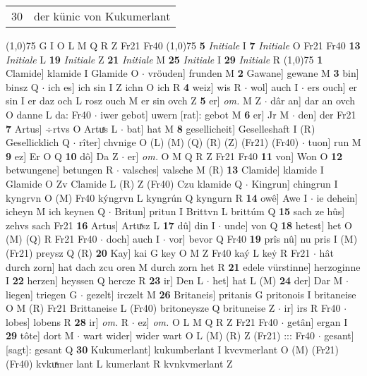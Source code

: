 \documentclass[8pt,a4paper,notitlepage]{article}
\begin{document}
\begin{table}[ht]
\begin{minipage}[t]{0.5\linewidth}
\begin{tabular}{rl}
30 & der künic von Kukumerlant\\ 
\end{tabular}
\scriptsize
\line(1,0){75} \newline
G I O L M Q R Z Fr21 Fr40 \newline
\line(1,0){75} \newline
\textbf{5} \textit{Initiale} I  \textbf{7} \textit{Initiale} O Fr21 Fr40  \textbf{13} \textit{Initiale} L  \textbf{19} \textit{Initiale} Z  \textbf{21} \textit{Initiale} M  \textbf{25} \textit{Initiale} I  \textbf{29} \textit{Initiale} R  \newline
\line(1,0){75} \newline
\textbf{1} Clamide] klamide I Glamide O  $\cdot$ vröuden] frunden M \textbf{2} Gawane] gewane M \textbf{3} bin] binsz Q  $\cdot$ ich es] ich sin I Z ichn O ich R \textbf{4} weiz] wis R  $\cdot$ wol] auch I  $\cdot$ ers ouch] er sin I er daz och L rosz ouch M er sin ovch Z \textbf{5} er] \textit{om.} M Z  $\cdot$ dâr an] dar an ovch O danne L da: Fr40  $\cdot$ iwer gebot] uwern [rat]: gebot M \textbf{6} er] Jr M  $\cdot$ den] der Fr21 \textbf{7} Artus] ÷rtvs O Artuͯs L  $\cdot$ bat] hat M \textbf{8} gesellicheit] Geselleshaft I (R) Gesellicklich Q  $\cdot$ rîter] chvnige O (L) (M) (Q) (R) (Z) (Fr21) (Fr40)  $\cdot$ tuon] run M \textbf{9} ez] Er O Q \textbf{10} dô] Da Z  $\cdot$ er] \textit{om.} O M Q R Z Fr21 Fr40 \textbf{11} von] Won O \textbf{12} betwungene] betungen R  $\cdot$ valsches] valsche M (R) \textbf{13} Clamide] klamide I Glamide O Zv Clamide L (R) Z (Fr40) Czu klamide Q  $\cdot$ Kingrun] chingrun I kyngrvn O (M) Fr40 kýngrvn L kyngrún Q kyngurn R \textbf{14} owê] Awe I  $\cdot$ ie dehein] icheyn M ich keynen Q  $\cdot$ Britun] pritun I Brittvn L brittúm Q \textbf{15} sach ze hûs] zehvs sach Fr21 \textbf{16} Artus] Artuͯsz L \textbf{17} dû] din I  $\cdot$ unde] von Q \textbf{18} hetest] het O (M) (Q) R Fr21 Fr40  $\cdot$ doch] auch I  $\cdot$ vor] bevor Q Fr40 \textbf{19} prîs nû] nu pris I (M) (Fr21) preysz Q (R) \textbf{20} Kay] kai G key O M Z Fr40 kaý L keẏ R Fr21  $\cdot$ hât durch zorn] hat dach zcu oren M durch zorn het R \textbf{21} edele vürstinne] herzoginne I \textbf{22} herzen] heyssen Q hercze R \textbf{23} ir] Den L  $\cdot$ het] hat L (M) \textbf{24} der] Dar M  $\cdot$ liegen] triegen G  $\cdot$ gezelt] irczelt M \textbf{26} Britaneis] pritanis G pritonois I britaneise O M (R) Fr21 Brittaneise L (Fr40) britoneysze Q brituneise Z  $\cdot$ ir] irs R Fr40  $\cdot$ lobes] lobens R \textbf{28} ir] \textit{om.} R  $\cdot$ ez] \textit{om.} O L M Q R Z Fr21 Fr40  $\cdot$ getân] ergan I \textbf{29} tôte] dort M  $\cdot$ wart wider] wider wart O L (M) (R) Z (Fr21) ::: Fr40  $\cdot$ gesant] [sagt]: gesant Q \textbf{30} Kukumerlant] kukumberlant I kvcvmerlant O (M) (Fr21) (Fr40) kvkuͯmer lant L kumerlant R kvnkvmerlant Z \newline

\end{minipage}
\end{table}
\end{document}
